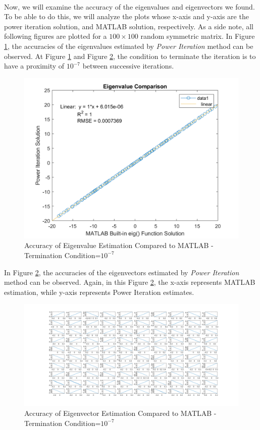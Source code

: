 \documentclass[letterpaper,12pt]{article}
\begin{document}
   \paragraph{}Now, we will examine the accuracy of the eigenvalues and eigenvectors we found. To be able to do this, we will analyze the plots whose x-axis and y-axis are the power iteration solution, and MATLAB solution, respectively. As a side note, all following figures are plotted for a $100 \times 100$ random symmetric matrix. In Figure \ref{fig:eigenvalue}, the accuracies of the eigenvalues estimated by \textit{Power Iteration} method can be observed. At Figure \ref{fig:eigenvalue} and Figure \ref{fig:eigenvector}, the condition to terminate the iteration is to have a proximity of $10^{-7}$ between successive iterations.
\begin{figure}[H] 
   \centering \includegraphics[width=0.7\columnwidth]{figures/eigenvalue.png}           
                  \caption{Accuracy of Eigenvalue Estimation Compared to MATLAB - Termination Condition=$10^{-7}$}                
                     \label{fig:eigenvalue}
   \end{figure}  
   In Figure \ref{fig:eigenvector}, the accuracies of the eigenvectors estimated by \textit{Power Iteration} method can be observed. Again, in this Figure \ref{fig:eigenvector}, the x-axis represents MATLAB estimation, while y-axis represents Power Iteration estimates.
\begin{figure}[H] 
   \centering \includegraphics[width=\columnwidth]{figures/eigenvector.png}           
                  \caption{Accuracy of Eigenvector Estimation Compared to MATLAB - Termination Condition=$10^{-7}$}                
                     \label{fig:eigenvector}
   \end{figure}
\end{document}
